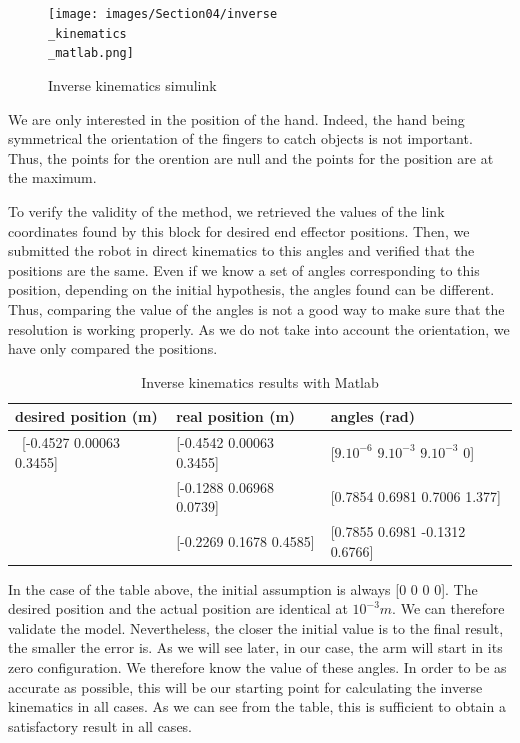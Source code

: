 \bigbreak
\begin{figure}[ht]
    \centering
    \texttt{[image: images/Section04/inverse\\\_kinematics\\\_matlab.png]}
    \caption{Inverse kinematics simulink}
    \label{fig:mesh14}
\end{figure}
\FloatBarrier

\bigbreak
We are only interested in the position of the hand. Indeed, the hand being symmetrical the orientation of the fingers to catch objects is not important. Thus, the points for the orention are null and the points for the position are at the maximum.

\bigbreak
To verify the validity of the method, we retrieved the values of the link coordinates found by this block for desired end effector positions. Then, we submitted the robot in direct kinematics to this angles and verified that the positions are the same. Even if we know a set of angles corresponding to this position, depending on the initial hypothesis, the angles found can be different. Thus, comparing the value of the angles is not a good way to make sure that the resolution is working properly. As we do not take into account the orientation, we have only compared the positions.

\begin{table}[ht]
    \centering
    \begin{tabular}{|p{4.5cm} | p{4.5cm} | p{5cm}|} 
        \hline
        \textbf{desired position (m)} & \textbf{real position (m)} & \textbf{angles (rad)}\\ [0.3ex] 
        \hline\
        [-0.4527 0.00063 0.3455] & [-0.4542 0.00063 0.3455] & [$9.10^{-6}$ $9.10^{-3}$ $9.10^{-3}$ 0] \\ 
        \hline
        [-0.1286 0.06948 0.07537] & [-0.1288 0.06968 0.0739] & [0.7854  0.6981 0.7006 1.377] \\ 
        \hline
        [-0.2259 0.1668 0.4583] & [-0.2269 0.1678 0.4585] & [0.7855  0.6981  -0.1312 0.6766] \\ 
        \hline
    \end{tabular}
    \caption{Inverse kinematics results with Matlab}
\end{table}
\FloatBarrier

\bigbreak
In the case of the table above, the initial assumption is always [0 0 0 0]. The desired position and the actual position are identical at $10^{-3}m$. We can therefore validate the model. Nevertheless, the closer the initial value is to the final result, the smaller the error is. As we will see later, in our case, the arm will start in its zero configuration. We therefore know the value of these angles. In order to be as accurate as possible, this will be our starting point for calculating the inverse kinematics in all cases. As we can see from the table, this is sufficient to obtain a satisfactory result in all cases.

